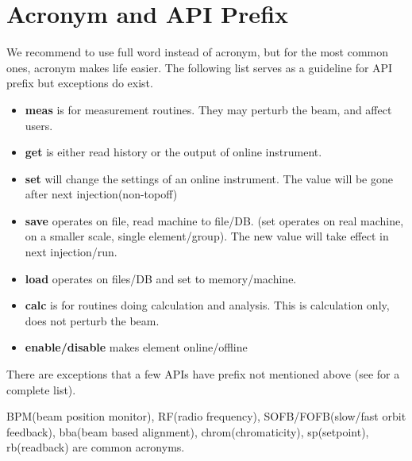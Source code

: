 \documentclass[11pt,oneside,letterpaper,showtrims,article]{memoir}
\newcommand{\strong}[1]{{\bfseries #1}}
\begin{document}
\appendix

\section{Acronym and API Prefix}

We recommend to use full word instead of acronym, but for the most
common ones, acronym makes life easier. The following list serves as a
guideline for API prefix but exceptions do exist.
\begin{itemize}
\item \strong{meas} is for measurement routines. They may perturb the beam, and affect users.
\item \strong{get} is either read history or the output of online instrument.
\item \strong{set} will change the settings of an online instrument. The value will be gone after next injection(non-topoff)
\item \strong{save} operates on file, read machine to file/DB. (set operates on real machine, on a smaller scale, single element/group). The new value will take effect in next injection/run. 
\item \strong{load} operates on files/DB and set to memory/machine.
\item \strong{calc} is for routines doing calculation and analysis. This is calculation only, does not perturb the beam.
\item \strong{enable/disable} makes element online/offline
\end{itemize}

There are exceptions that a few APIs have prefix not mentioned above
(see \cite{shen_hla_apis} for a complete list).

BPM(beam position monitor), RF(radio frequency), SOFB/FOFB(slow/fast
orbit feedback), bba(beam based alignment), chrom(chromaticity),
sp(setpoint), rb(readback) are common acronyms.


%
%
\end{document}

